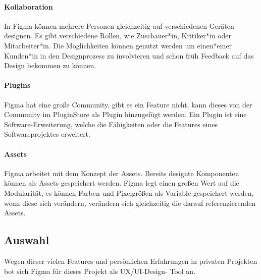 \paragraph{Kollaboration}
In Figma können mehrere Personen gleichzeitig auf verschiedenen Geräten designen. Es gibt verschiedene Rollen, wie Zuschauer*in, Kritiker*in oder Mitarbeiter*in. Die Möglichkeiten können genutzt werden um einen*einer Kunden*in in den Designprozess zu involvieren und schon früh Feedback auf das Design bekommen zu können.
\paragraph{Plugins}
Figma hat eine große Community, gibt es ein Feature nicht, kann dieses von der Community im PluginStore als Plugin hinzugefügt werden. Ein Plugin ist eine Software-Erweiterung, welche die Fähigkeiten oder die Features eines Softwareprojektes erweitert.

\paragraph{Assets}
Figma arbeitet mit dem Konzept der Assets. Bereits designte Komponenten können als Assets gespeichert werden. Figma legt einen großen Wert auf die Modularität, es können Farben und Pixelgrößen als Variable gespeichert werden, wenn diese sich verändern, verändern sich gleichzeitig die darauf referenzierenden Assets.

\subsection{Auswahl}
Wegen dieser vielen Features und persönlichen Erfahrungen in privaten Projekten bot sich Figma für dieses Projekt als UX/UI-Design- Tool an.